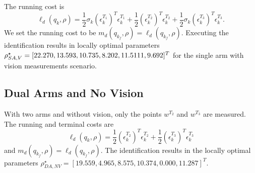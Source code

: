 \documentclass[runningheads,a4paper]{llncs}
\begin{document}

The running cost is 
\[
\ell_d(q_k,\rho) = \frac{1}{2}\sigma_k (\epsilon^{T_1}_k)^T\epsilon^{T_1}_k + \frac{1}{2} (\epsilon^{T_2}_k)^T\epsilon^{T_2}_k +\frac{1}{2}\sigma_k (\epsilon^{T_3}_k)^T\epsilon^{T_3}_k.
\]
We set the running cost to be $m_d(q_{k_f},\rho) = \ell_d(q_{k_f},\rho)$. Executing the identification results in locally optimal parameters $\rho^\star_{SA,V} = [22.270, 13.593, 10.735, 8.202 , \\11.5111,   9.692]^T$ for the single arm with vision measurements scenario.

\subsection{Dual Arms and No Vision \label{sec-2_no_vis}}
With two arms and without vision, only the points $w^{T_2}$ and $w^{T_3}$ are measured. The running and terminal costs are 
\[
\ell_d(q_k,\rho) = \frac{1}{2}(\epsilon^{T_2}_k)^T\epsilon^{T_2}_k +\frac{1}{2}(\epsilon^{T_3}_k)^T\epsilon^{T_3}_k 
\]
and $m_d(q_{k_f},\rho) = \ell_d(q_{k_f},\rho)$. The identification results in the locally optimal parameters $\rho^\star_{DA,NV} = [19.559, 4.965, 8.575, 10.374, 0.000, 11.287]^T$.
\end{document}
